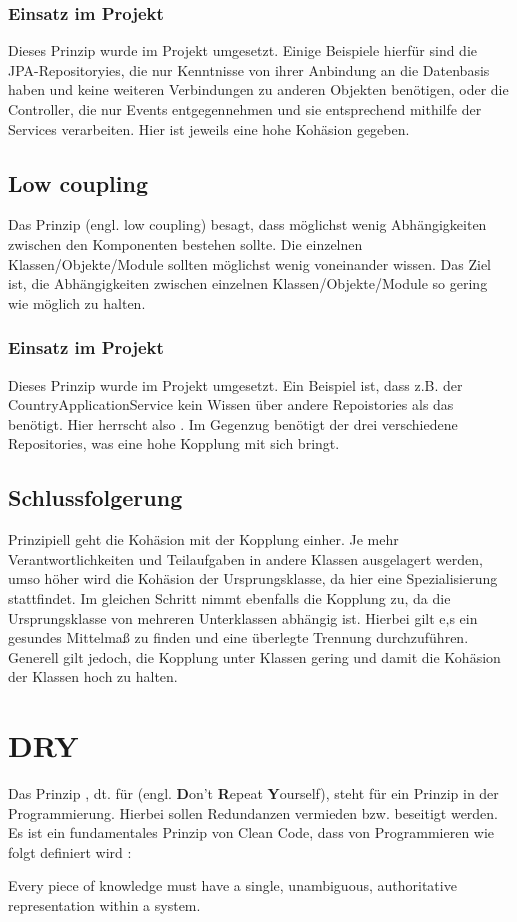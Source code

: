 				\subsubsection{Einsatz im Projekt}
				Dieses Prinzip wurde im Projekt umgesetzt. Einige Beispiele hierfür sind die JPA-Repositoryies, die nur Kenntnisse von ihrer Anbindung an die Datenbasis haben und keine weiteren Verbindungen zu anderen Objekten benötigen, oder die Controller, die nur Events entgegennehmen und sie entsprechend mithilfe der Services verarbeiten. Hier ist jeweils eine hohe Kohäsion gegeben.
			
			\subsection{Low coupling \cite{kohaesion.google}} \label{3.lowCoupling}
			Das Prinzip  (engl. low coupling) besagt, dass möglichst wenig Abhängigkeiten zwischen den Komponenten bestehen sollte. Die einzelnen Klassen/Objekte/Module sollten möglichst wenig voneinander wissen. Das Ziel ist, die Abhängigkeiten zwischen einzelnen Klassen/Objekte/Module so gering wie möglich zu halten.
				\subsubsection{Einsatz im Projekt}
				Dieses Prinzip wurde im Projekt umgesetzt. Ein Beispiel ist, dass z.B. der CountryApplicationService kein Wissen über andere Repoistories als das  benötigt. Hier herrscht also . Im Gegenzug benötigt der  drei verschiedene Repositories, was eine hohe Kopplung mit sich bringt.
			
		\subsection{Schlussfolgerung}
		Prinzipiell geht die Kohäsion mit der Kopplung einher. Je mehr Verantwortlichkeiten und Teilaufgaben in andere Klassen ausgelagert werden, umso höher wird die Kohäsion der Ursprungsklasse, da hier eine Spezialisierung stattfindet. Im gleichen Schritt nimmt ebenfalls die Kopplung zu, da die Ursprungsklasse von mehreren Unterklassen abhängig ist. Hierbei gilt e,s ein gesundes Mittelmaß zu finden und eine überlegte Trennung durchzuführen. Generell gilt jedoch, die Kopplung unter Klassen gering und damit die Kohäsion der Klassen hoch zu halten.
		
	\section{DRY}
	Das Prinzip , dt. für  (engl. \textbf{D}on't \textbf{R}epeat \textbf{Y}ourself), steht für ein Prinzip in der Programmierung. Hierbei sollen Redundanzen vermieden bzw. beseitigt werden. Es ist ein fundamentales Prinzip von Clean Code, dass von Programmieren wie folgt definiert wird :
	\par Every piece of knowledge must have a single, unambiguous, authoritative representation within a system. \cite{dry.thevaluable}
	\\
